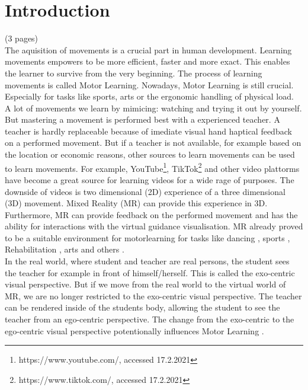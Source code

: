 \chapter{Introduction}
(3 pages)\\
The aquisition of movements is a crucial part in human development. Learning movements empowers to be more efficient, faster and more exact. This enables the learner to survive from the very beginning. The process of learning movements is called Motor Learning. Nowadays, Motor Learning is still crucial. Especially for tasks like sports, arts or the ergonomic handling of physical load.\\
A lot of movements we learn by mimicing: watching and trying it out by yourself. But mastering a movement is performed best with a experienced teacher. A teacher is hardly  replaceable because of imediate visual hand haptical feedback on a performed movement. But if a teacher is not available, for example based on the location or economic reasons, other sources to learn movements can be used to learn movements. For example, YouTube\footnote{https://www.youtube.com/, accessed 17.2.2021}, TikTok\footnote{https://www.tiktok.com/, accessed 17.2.2021} and other video plattorms have become a great source for learning videos for a wide rage of purposes. The downside of videos is two dimensional (2D) experience of a three dimensional (3D) movement. Mixed Reality (MR) can provide this experience in 3D. Furthermore, MR can provide feedback on the performed movement and has the ability for interactions with the virtual guidance visualisation. MR already proved to be a suitable environment for motorlearning for tasks like dancing , sports , Rehabilitation , arts  and others .\\
In the real world, where student and teacher are real persons, the student sees the teacher for example in front of himself/herself. This is called the exo-centric visual perspective. But if we move from the real world to the virtual world of MR, we are no longer restricted to the exo-centric visual perspective. The teacher can be rendered inside of the students body, allowing the student to see the teacher from an ego-centric perspective. The change from the exo-centric to the ego-centric visual perspective potentionally influences Motor Learning .\\

